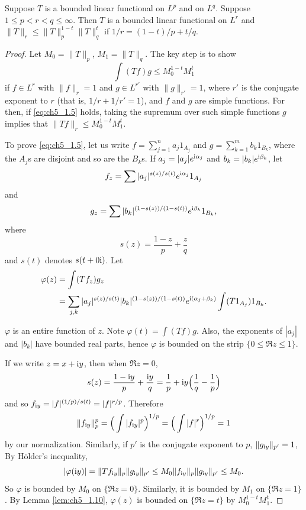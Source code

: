 \begin{theorem}\label{thm:ch5_1.11}
Suppose $T$ is a bounded linear functional on $L^p$ and on $L^q$. Suppose $1 \leq p < r < q \leq \infty$. Then $T$ is a bounded linear functional on $L^r$ and $\|T\|_r \leq \|T\|_p^{1-t}\|T\|_q^t$ if $1/r = (1-t)/p + t/q$.
\end{theorem}

\begin{proof}
Let $M_0 = \|T\|_p$, $M_1 = \|T\|_q$. The key step is to show
\begin{equation}\label{eq:ch5_1.5}
    \int (Tf)g \leq M_0^{1-t}M_1^t
\end{equation}
if $f \in L^r$ with $\|f\|_r = 1$ and $g \in L^{r'}$ with $\|g\|_{r'} = 1$, where $r'$ is the conjugate exponent to $r$ (that is, $1/r + 1/r' = 1$), and $f$ and $g$ are simple functions. For then, if \eqref{eq:ch5_1.5} holds, taking the supremum over such simple functions $g$ implies that $\|Tf\|_r \leq M_0^{1-t}M_1^t$.

To prove \eqref{eq:ch5_1.5}, let us write $f = \sum_{j=1}^n a_j1_{A_j}$ and $g = \sum_{k=1}^m b_k1_{B_k}$, where the $A_j$s are disjoint and so are the $B_k$s. If $a_j = |a_j|e^{\mathrm{i}\alpha_j}$ and $b_k = |b_k|e^{\mathrm{i}\beta_k}$, let
\[
    f_z = \sum |a_j|^{s(z)/s(t)}e^{\mathrm{i}\alpha_j}1_{A_j}
\]
and
\[
    g_z = \sum |b_k|^{(1-s(z))/(1-s(t))}e^{\mathrm{i}\beta_k}1_{B_k},
\]
where
\mpagebreak
\[
    s(z) = \frac{1-z}{p} + \frac{z}{q}
\]
and $s(t)$ denotes $s(t + 0\mathrm{i})$. Let
\begin{align*}
    \varphi(z) &= \int (Tf_z)g_z \\
    &=\sum_{j,k}|a_j|^{s(z)/s(t)}|b_k|^{(1-s(z))/(1-s(t))}e^{\mathrm{i} (\alpha_j+\beta_k)}\int (T1_{A_j})1_{B_k}.
\end{align*}

$\varphi$ is an entire function of $z$. Note $\varphi(t) = \int (Tf)g$. Also, the exponents of $|a_j|$ and $|b_k|$ have bounded real parts, hence $\varphi$ is bounded on the strip $\{0\le \Re z \le 1\}$.

If we write $z=x+\mathrm{i} y$, then when $\Re z = 0$,
\[
    s(z)=\frac{1-\mathrm{i} y}{p}+\frac{\mathrm{i} y}{q}=\frac{1}{p}+\mathrm{i} y\Big(\frac{1}{q}-\frac{1}{p}\Big)
\]
and so $f_{\mathrm{i} y}=|f|^{(1/p)/s(t)}=|f|^{r/p}$. Therefore
\[
    \|f_{\mathrm{i} y}\|_p^p = \Big(\int |f_{\mathrm{i} y}|^p\Big)^{1/p} = \Big(\int  |f|^r\Big)^{1/p} = 1
\]
by our normalization. Similarly, if $p'$ is the conjugate exponent to $p$, $\|g_{\mathrm{i} y}\|_{p'}=1$, By H\"older's inequality,
\[
    |\varphi(\mathrm{i} y)|=\|T f_{\mathrm{i} y}\|_p\|g_{\mathrm{i} y}\|_{p'}\leq M_0\|f_{\mathrm{i} y}\|_p\|g_{\mathrm{i} y}\|_{p'}\leq M_0.
\]
So $\varphi$ is bounded by $M_0$ on $\{\Re z = 0\}$. Similarly, it is bounded by $M_1$ on $\{\Re z = 1\}$. By Lemma \ref{lem:ch5_1.10}, $\varphi(z)$ is bounded on $\{\Re z = t\}$ by $M_0^{1-t}M_1^t$.
\end{proof}

